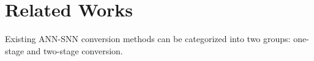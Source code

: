 \section{Related Works}
Existing ANN-SNN conversion methods can be categorized into two groups: one-stage and two-stage conversion.



